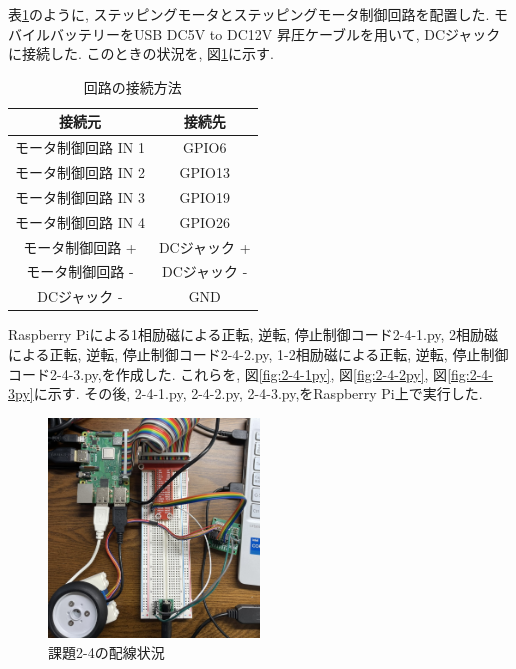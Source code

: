 \documentclass{ltjsarticle} %
\begin{document}
表\ref{tab:tab2-4}のように, ステッピングモータとステッピングモータ制御回路を配置した. 
モバイルバッテリーをUSB DC5V to DC12V 昇圧ケーブルを用いて, DCジャックに接続した. 
このときの状況を, 図\ref{fig:raspi2-4}に示す. 

\begin{table}[H] %
  \centering %
  \caption{回路の接続方法}
  \begin{tabular}{|c|c|} 
  \hline %
  接続元 & 接続先  \\ \hline %
  モータ制御回路 IN 1 & GPIO6    \\ \hline
  モータ制御回路 IN 2 & GPIO13   \\ \hline
  モータ制御回路 IN 3 & GPIO19   \\ \hline
  モータ制御回路 IN 4 & GPIO26   \\ \hline
  モータ制御回路 + & DCジャック + \\ \hline
  モータ制御回路 - & DCジャック - \\ \hline
  DCジャック -  & GND \\ \hline

  \end{tabular}
  \label{tab:tab2-4} %
\end{table}

Raspberry Piによる1相励磁による正転, 逆転, 停⽌制御コード2-4-1.py, 2相励磁による正転, 逆転, 停⽌制御コード2-4-2.py, 
1-2相励磁による正転, 逆転, 停⽌制御コード2-4-3.py,を作成した. 
これらを, 図\ref{fig:2-4-1py}, 図\ref{fig:2-4-2py}, 図\ref{fig:2-4-3py}に示す.
その後, 2-4-1.py, 2-4-2.py, 2-4-3.py,をRaspberry Pi上で実行した. 

\begin{figure}[H] %
  \centering
  \includegraphics[width=0.5\textwidth]{raspi2-4.JPEG} %
  \caption{課題2-4の配線状況} %
  \label{fig:raspi2-4} %
\end{figure}
\end{document}
